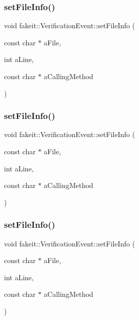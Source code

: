 \subsubsection{\texorpdfstring{setFileInfo()}{setFileInfo()}\hspace{0.1cm}{\footnotesize\ttfamily [5/9]}}
{\footnotesize\ttfamily void fakeit\+::\+Verification\+Event\+::set\+File\+Info (\begin{DoxyParamCaption}\item[{const char $\ast$}]{a\+File,  }\item[{int}]{a\+Line,  }\item[{const char $\ast$}]{a\+Calling\+Method }\end{DoxyParamCaption})\hspace{0.3cm}{\ttfamily [inline]}}

\mbox{\label{structfakeit_1_1VerificationEvent_a6199b34d65e06976395f606f0c92f361}} 
\subsubsection{\texorpdfstring{setFileInfo()}{setFileInfo()}\hspace{0.1cm}{\footnotesize\ttfamily [6/9]}}
{\footnotesize\ttfamily void fakeit\+::\+Verification\+Event\+::set\+File\+Info (\begin{DoxyParamCaption}\item[{const char $\ast$}]{a\+File,  }\item[{int}]{a\+Line,  }\item[{const char $\ast$}]{a\+Calling\+Method }\end{DoxyParamCaption})\hspace{0.3cm}{\ttfamily [inline]}}

\mbox{\label{structfakeit_1_1VerificationEvent_a6199b34d65e06976395f606f0c92f361}} 
\subsubsection{\texorpdfstring{setFileInfo()}{setFileInfo()}\hspace{0.1cm}{\footnotesize\ttfamily [7/9]}}
{\footnotesize\ttfamily void fakeit\+::\+Verification\+Event\+::set\+File\+Info (\begin{DoxyParamCaption}\item[{const char $\ast$}]{a\+File,  }\item[{int}]{a\+Line,  }\item[{const char $\ast$}]{a\+Calling\+Method }\end{DoxyParamCaption})\hspace{0.3cm}{\ttfamily [inline]}}

